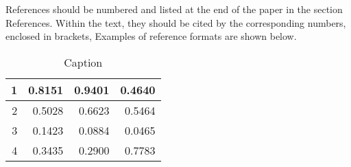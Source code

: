 \documentclass[12pt]{article}
\begin{document}
References should be numbered and listed at the end of the paper in the section References.
Within the text, they should be cited by the corresponding numbers, enclosed in brackets,
Examples of reference formats are shown below.
\begin{table}[!h]
\centering
\begin{tabular}{|r|r|r|r|}
  \hline
  1 & 0.8151 & 0.9401 & 0.4640 \\   \hline
  2 & 0.5028 & 0.6623 & 0.5464 \\   \hline
  3 & 0.1423 & 0.0884 & 0.0465 \\   \hline
  4 & 0.3435 & 0.2900 & 0.7783 \\   \hline
\end{tabular}
\caption{Caption}
\end{table}



\end{document}
